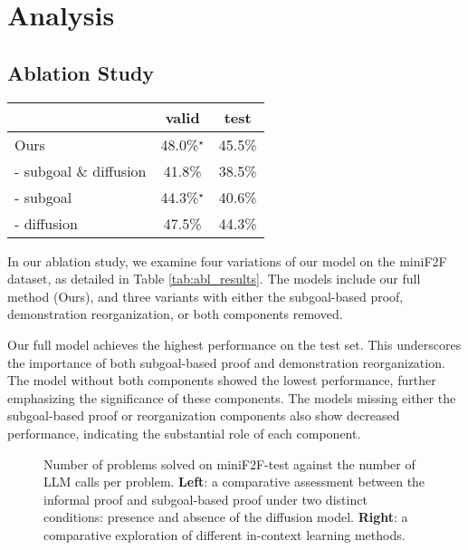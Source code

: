 \documentclass{article}
\begin{document}
\section{Analysis}
\label{sec:analysis}


\subsection{Ablation Study}
\label{sec:analysis_abl}


\begin{table*}[t!]
\centering
\vspace{-2mm}
\caption{Ablation results on the miniF2F dataset with Isabelle. Numbers with a $\star$ correspond to the cumulative pass rate.}
\label{tab:abl_results}
\begin{tabular}{lcc}
\toprule
\multicolumn{1}{c}{\textbf{}}    & valid & test \\ \midrule
Ours                             & 48.0\%$^{\star}$        & 45.5\%       \\ \midrule
- subgoal \& diffusion & 41.8\%        & 38.5\%       \\
- subgoal               & 44.3\%$^{\star}$        & 40.6\%       \\
- diffusion             & 47.5\%        & 44.3\%      \\ \bottomrule
\end{tabular}
\end{table*}

In our ablation study, we examine four variations of our model on the miniF2F dataset, as detailed in Table \ref{tab:abl_results}. The models include our full method (Ours), and three variants with either the subgoal-based proof, demonstration reorganization, or both components removed.

Our full model achieves the highest performance on the test set. This underscores the importance of both subgoal-based proof and demonstration reorganization. The model without both components showed the lowest performance, further emphasizing the significance of these components. The models missing either the subgoal-based proof or reorganization components also show decreased performance, indicating the substantial role of each component.


\begin{figure}[t!]
\centering
{}
\vspace{-2mm}
\caption{Number of problems solved on miniF2F-test against the number of LLM calls per problem. \textbf{Left}: a comparative assessment between the informal proof and subgoal-based proof under two distinct conditions: presence and absence of the diffusion model. \textbf{Right}: a comparative exploration of different in-context learning methods.}
\end{figure}
\end{document}
